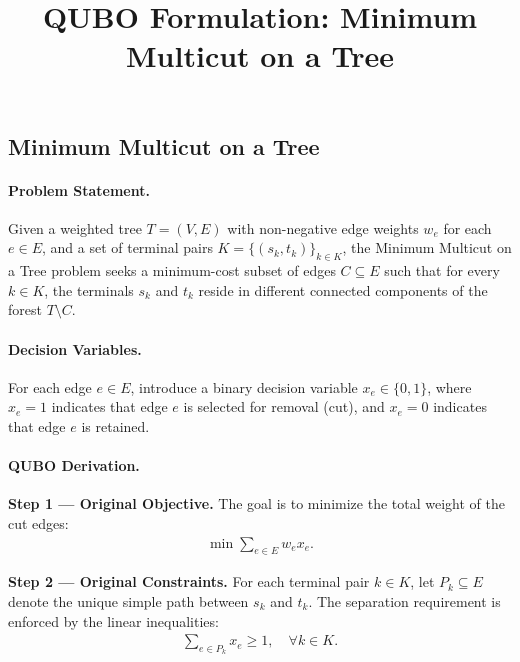 \documentclass[12pt]{article}
\title{QUBO Formulation: Minimum Multicut on a Tree}
\date{}
\begin{document}
\maketitle

\subsection*{Minimum Multicut on a Tree}

\paragraph{Problem Statement.}
Given a weighted tree $T = (V, E)$ with non-negative edge weights $w_e$ for each $e \in E$, and a set of terminal pairs $K = \{(s_k, t_k)\}_{k \in K}$, the Minimum Multicut on a Tree problem seeks a minimum-cost subset of edges $C \subseteq E$ such that for every $k \in K$, the terminals $s_k$ and $t_k$ reside in different connected components of the forest $T \setminus C$.

\paragraph{Decision Variables.}
For each edge $e \in E$, introduce a binary decision variable $x_e \in \{0,1\}$, where $x_e = 1$ indicates that edge $e$ is selected for removal (cut), and $x_e = 0$ indicates that edge $e$ is retained.

\paragraph{QUBO Derivation.}
\textbf{Step 1 --- Original Objective.} The goal is to minimize the total weight of the cut edges:
\begin{align}
    \min \sum_{e \in E} w_e x_e.
\end{align}

\textbf{Step 2 --- Original Constraints.} For each terminal pair $k \in K$, let $P_k \subseteq E$ denote the unique simple path between $s_k$ and $t_k$. The separation requirement is enforced by the linear inequalities:
\begin{align}
    \sum_{e \in P_k} x_e \ge 1, \quad \forall k \in K.
\end{align}
\end{document}
